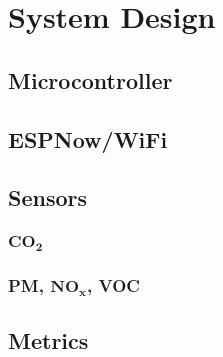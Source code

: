 \chapter{System Design}

\section{Microcontroller}

\section{ESPNow/WiFi}

\section{Sensors}
\subsection{$\mathbf{CO_2}$}
\subsection{PM, $\mathbf{NO_x}$, VOC}

\section{Metrics}
